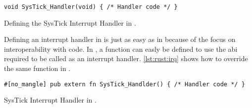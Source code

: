 \begin{listing}[H]
  \begin{verbatim}
void SysTick_Handler(void) { /* Handler code */ }
  \end{verbatim}
  \caption{Defining the SysTick Interrupt Handler in {\C}.}
  \label{lst:c:irq}
\end{listing}

Defining an interrupt handler in {\rust} is just as easy as in {\C} because of the focus on interoperability with {\C} code.
In {\rust}, a function can easly be defined to use the {\C} \gls{abi} required to be called as an interrupt handler.
\autoref{lst:rust:irq} shows how to override the same  function in {\rust}.

\begin{listing}[H]
  \begin{verbatim}
#[no_mangle] pub extern fn SysTick_Handlder() { /* Handler code */ }
  \end{verbatim}
  \caption{SysTick Interrupt Handler in {\rust}.}
  \label{lst:rust:irq}
\end{listing}
